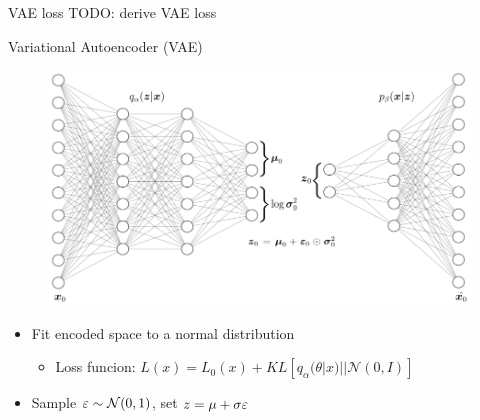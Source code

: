 \documentclass{beamer}
\def \e{\ensuremath \varepsilon}
\theoremstyle{definition}
\begin{document}

\begin{frame}{VAE loss}
  TODO: derive VAE loss
\end{frame}

\begin{frame}{Variational Autoencoder (VAE)}
\begin{figure}
  \includegraphics[width=.7\textwidth]{../img/vae_visual.png}
\end{figure}
\begin{itemize}
  \item<1-> Fit encoded space to a normal distribution
  \begin{itemize}
    \item<1-> Loss funcion: $L(x) = L_0(x) + KL[q_\alpha(\theta | x) || \mathcal{N}(0,I)] $
  \end{itemize}
  \item<2-> Sample $\e \sim \mathcal{N}(0,1)$, set $z = \mu + \sigma \e$
\end{itemize}
\end{frame}
\end{document}
